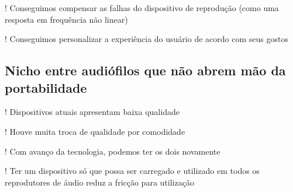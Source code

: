 ! Conseguimos compensar as falhas do dispositivo de reprodução (como uma resposta em frequência não linear)

! Conseguimos personalizar a experiência do usuário de acordo com seus gostos
\subsection{Nicho entre audiófilos que não abrem mão da portabilidade}
! Dispositivos atuais apresentam baixa qualidade

! Houve muita troca de qualidade por comodidade

! Com avanço da tecnologia, podemos ter os dois novamente

! Ter um dispositivo só que possa ser carregado e utilizado em todos os reprodutores de áudio reduz a fricção para utilização 

